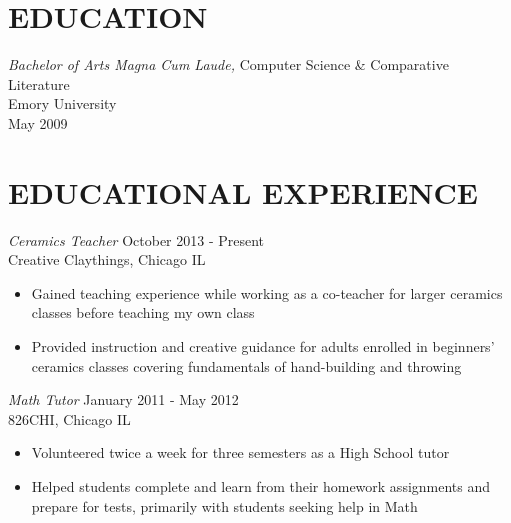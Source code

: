 \documentclass[line,margin]{res}
\begin{document}
\address{waltaskew@gmail.com}
\address{404-819-9796}

\begin{resume}

\section{EDUCATION}
        {\sl Bachelor of Arts Magna Cum Laude,} 
        Computer Science \& Comparative Literature \\
        Emory University \\
        May 2009
 
\section{EDUCATIONAL EXPERIENCE} 
        {\sl Ceramics Teacher} \hfill October 2013 - Present \\
        Creative Claythings, Chicago IL
        \begin{itemize}
          \item Gained teaching experience while working as a
            co-teacher for larger ceramics classes  before teaching my
            own class 
          \item Provided instruction and creative guidance for adults
            enrolled in beginners' ceramics classes covering
            fundamentals of hand-building and throwing
        \end{itemize}

        {\sl Math Tutor} \hfill January 2011 - May 2012 \\
        826CHI, Chicago IL
        \begin{itemize}
        \item Volunteered twice a week for three semesters as a High
          School tutor
        \item Helped students complete and learn from their homework
          assignments and prepare for tests, primarily
          with students seeking help in Math
        \end{itemize}


\end{resume}
\end{document}
